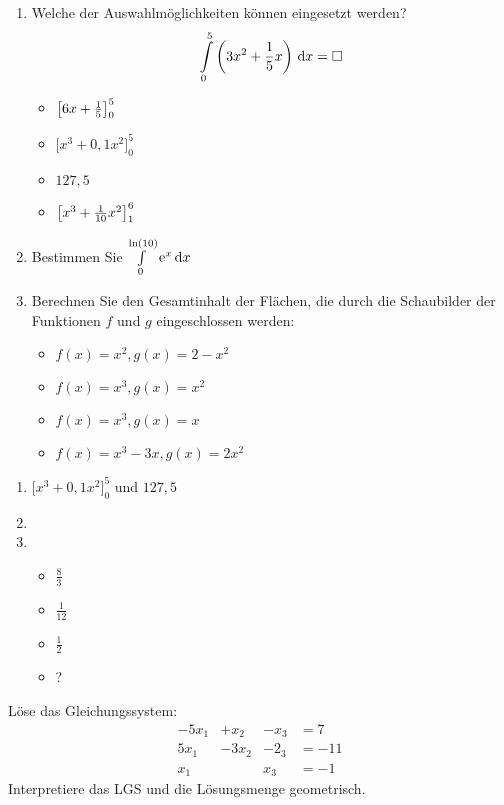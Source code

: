\begin{enumerate}
	\item Welche der Auswahlmöglichkeiten können eingesetzt werden?
	\begin{equation*}
		\int\limits_0^5 \left(3x^2+ \frac 1 5 x\right)  \,\mathrm{d} x = \Box
	\end{equation*}
  \begin{multicols}{4}
    \begin{itemize}
      \item $\left[ 6x + \frac{1}{5} \right]_0^5$
      \item $\bigg[x^3 + 0,1 x^2\bigg]_0^5$
  		\item $127,5$
      \item $\left[ x^3 + \frac{1}{10} x^2 \right]_1^6$
  	\end{itemize}
  \end{multicols}


	\item Bestimmen Sie $\int\limits_0^{\ln(10)} \mathrm{e}^x \,\mathrm{d} x$
  \item Berechnen Sie den Gesamtinhalt der Flächen, die durch die Schaubilder der Funktionen $f$ und $g$ eingeschlossen werden:
  \begin{itemize}
    \item $f(x)=x^2, g(x)=2-x^2$
    \item $f(x)=x^3, g(x)=x^2$
    \item $f(x)=x^3, g(x)=x$
    \item $f(x)=x^3-3x, g(x)=2x^2$
  \end{itemize}
\end{enumerate}
\begin{lsg}{}
  \begin{enumerate}
    \item $\bigg[x^3 + 0,1 x^2\bigg]_0^5$ und $127,5$
    \item
    \item
    \begin{itemize}
      \item $\frac 8 3$
      \item $\frac 1 {12}$
      \item $\frac 1 2$
      \item ?
    \end{itemize}
  \end{enumerate}
\end{lsg}




Löse das Gleichungssystem:
\begin{alignat*}{4}
	-5x_1& +x_2& -x_3& = 7\\
	5x_1&  -3x_2& -2_3& = -11\\
	x_1& & x_3& =-1
\end{alignat*}
Interpretiere das LGS und die Lösungsmenge geometrisch.



